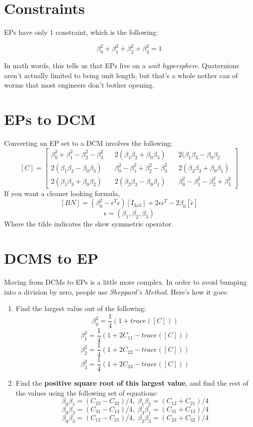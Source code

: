 \documentclass[a4paper,14pt]{extreport}
\begin{document}
\section{Constraints}
EPs have only 1 constraint, which is the following:\

\[\beta_0^2+\beta_1^2+\beta_2^2+\beta_3^2=1\]

In math words, this tells us that EPs live on a \emph{unit hypersphere}. Quaternions aren't actually limited to being unit length, but that's a whole nother can of worms that most engineers don't bother opening.
\section{EPs to DCM}
Converting an EP set to a DCM involves the following:
\[
[C] = 
\begin{bmatrix}
\beta_0^2+\beta_1^2-\beta_2^2-\beta_3^2&&2(\beta_1\beta_2+\beta_0\beta_3)&&2(\beta_1\beta_3-\beta_0\beta_2\\
2(\beta_1\beta_2-\beta_0\beta_3)&&\beta_0^2-\beta_1^2+\beta_2^2-\beta_3^2&&2(\beta_2\beta_3+\beta_0\beta_1)\\2(\beta_1\beta_3+\beta_0\beta_2)&&2(\beta_2\beta_3-\beta_0\beta_1)&&\beta_0^2-\beta_1^2-\beta_2^2+\beta_3^2
\end{bmatrix}
\]
If you want a cleaner looking formula,
\[
[BN] = (\beta_0^2 - \epsilon^T\epsilon)[I_{3x3}]+2\epsilon\epsilon^T-2\beta_0[\tilde{\epsilon}]
\]
\[
\epsilon = (\beta_1,\beta_2,\beta_3)
\]
Where the tilde indicates the skew symmetric operator.
\section{DCMS to EP}
Moving from DCMs to EPs is a little more complex. In order to avoid bumping into a division by zero, people use \emph{Sheppard's Method}. Here's how it goes:
\begin{enumerate}
\item{Find the largest value out of the following:\\
\[
\beta_0^2 = \dfrac{1}{4}(1+trace([C]))
\]
\[
\beta_1^2 = \dfrac{1}{4}(1+2C_{11}-trace([C]))
\]
\[
\beta_2^2 = \dfrac{1}{4}(1+2C_{22}-trace([C]))
\]
\[
\beta_3^2 = \dfrac{1}{4}(1+2C_{33}-trace([C]))
\]}
\item{Find the \textbf{positive square root of this largest value}, and find the rest of the values using the following set of equations:\\
\[\beta_0\beta_1=(C_{23}-C_{32})/4,\;\beta_1\beta_2=(C_{12}+C_{21})/4\]
\[\beta_0\beta_2=(C_{31}-C_{13})/4,\;\beta_3\beta_1=(C_{31}+C_{13})/4\]
\[\beta_0\beta_3=(C_{12}-C_{21})/4,\;\beta_2\beta_3=(C_{23}+C_{32})/4\]
}
\end{enumerate}
\end{document}
